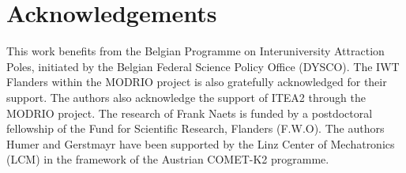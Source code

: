 \section*{Acknowledgements}
This work benefits from the Belgian Programme on Interuniversity Attraction Poles, initiated by the Belgian Federal Science Policy Office (DYSCO). The IWT Flanders within the MODRIO project is also gratefully acknowledged for their support. The authors also acknowledge the support of ITEA2 through the MODRIO project. 
The research of Frank Naets is funded by a postdoctoral fellowship of the Fund for Scientific Research, Flanders (F.W.O).
%
The authors Humer and Gerstmayr have been supported by the Linz Center of Mechatronics (LCM) in the framework of the Austrian COMET-K2 programme.